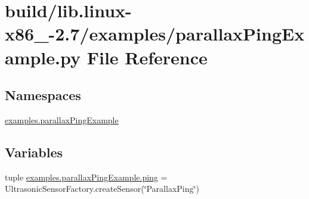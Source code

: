 \hypertarget{build_2lib_8linux-x86__64-2_87_2examples_2parallaxPingExample_8py}{}\section{build/lib.linux-\/x86\+\_-\/2.7/examples/parallax\+Ping\+Example.py File Reference}
\label{build_2lib_8linux-x86__64-2_87_2examples_2parallaxPingExample_8py}
\subsection*{Namespaces}
\begin{DoxyCompactItemize}
\item 
 \hyperlink{namespaceexamples_1_1parallaxPingExample}{examples.\+parallax\+Ping\+Example}
\end{DoxyCompactItemize}
\subsection*{Variables}
\begin{DoxyCompactItemize}
\item 
tuple \hyperlink{namespaceexamples_1_1parallaxPingExample_a4985eb3e4e74c154f1db607dac9234e4}{examples.\+parallax\+Ping\+Example.\+ping} = Ultrasonic\+Sensor\+Factory.\+create\+Sensor(\char`\"{}Parallax\+Ping\char`\"{})
\end{DoxyCompactItemize}
